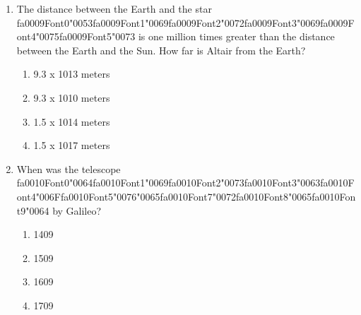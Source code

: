 \documentclass[12pt]{article}
\begin{document}
\begin{enumerate}[label=\arabic*.]
{\csname fa0008Font0\endcsname\char"0065}{\csname fa0008Font1\endcsname\char"0072}{\char"006F}{\csname fa0008Font3\endcsname\char"0069}{\csname fa0008Font4\endcsname\char"0064}{\csname fa0008Font5\endcsname\char"0073}?
\begin{enumerate}[label=(\alph*)]
    \item The Moon split from the Earth due to tidal forces.
    \item The Moon was captured into Earth orbit.
    \item The Earth and Moon co-accreted in the solar nebula.
    \item Earth was rotating so rapidly that the Moon split from it.
\end{enumerate}
\item The distance between the Earth and the star {\csname fa0009Font0\endcsname\char"0053}{\csname fa0009Font1\endcsname\char"0069}{\csname fa0009Font2\endcsname\char"0072}{\csname fa0009Font3\endcsname\char"0069}{\csname fa0009Font4\endcsname\char"0075}{\csname fa0009Font5\endcsname\char"0073} is one million times greater than the
distance between the Earth and the Sun. How far is Altair from the Earth?
\begin{enumerate}[label=(\alph*)]
    \item 9.3 x 1013 meters
    \item 9.3 x 1010 meters
    \item 1.5 x 1014 meters
    \item 1.5 x 1017 meters
\end{enumerate}
\item When was the telescope {\csname fa0010Font0\endcsname\char"0064}{\csname fa0010Font1\endcsname\char"0069}{\csname fa0010Font2\endcsname\char"0073}{\csname fa0010Font3\endcsname\char"0063}{\csname fa0010Font4\endcsname\char"006F}{\csname fa0010Font5\endcsname\char"0076}{\char"0065}{\csname fa0010Font7\endcsname\char"0072}{\csname fa0010Font8\endcsname\char"0065}{\csname fa0010Font9\endcsname\char"0064} by Galileo?
\begin{enumerate}[label=(\alph*)]
    \item 1409
    \item 1509
    \item 1609
    \item 1709
\end{enumerate}
\end{enumerate}
\end{document}
